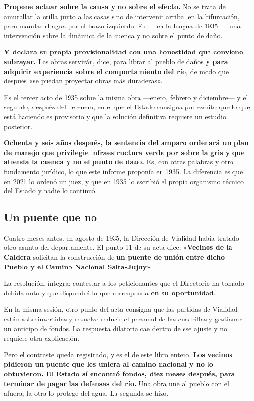 \textbf{Propone actuar sobre la causa y no sobre el efecto.} No se trata de amurallar la
orilla junto a las casas sino de intervenir arriba, en la bifurcación, para mandar el agua
por el brazo izquierdo. Es --- en la lengua de 1935 --- una intervención sobre la dinámica de
la cuenca y no sobre el punto de daño.

\textbf{Y declara su propia provisionalidad con una honestidad que conviene subrayar.} Las
obras servirán, dice, para librar al pueblo de daños \textbf{y para adquirir experiencia
sobre el comportamiento del río}, de modo que después «se puedan proyectar obras más
duraderas».

Es el tercer acto de 1935 sobre la misma obra ---enero, febrero y diciembre--- y el segundo, después del de enero, en el que el Estado consigna por escrito que lo que está haciendo es provisorio y que la
solución definitiva requiere un estudio posterior.

\textbf{Ochenta y seis años después, la sentencia del amparo ordenará un plan de manejo que
privilegie infraestructura verde por sobre la gris y que atienda la cuenca y no el punto de
daño.} Es, con otras palabras y otro fundamento jurídico, lo que este informe proponía en
1935. La diferencia es que en 2021 lo ordenó un juez, y que en 1935 lo escribió el propio
organismo técnico del Estado y nadie lo continuó.

\subsection*{Un puente que no}

Cuatro meses antes, en agosto de 1935, la Dirección de Vialidad había tratado otro asunto del
departamento. El punto 11 de su acta dice: «\textbf{Vecinos de la Caldera} solicitan la
construcción de \textbf{un puente de unión entre dicho Pueblo y el Camino Nacional
Salta-Jujuy}».

La resolución, íntegra: contestar a los peticionantes que el Directorio ha tomado debida nota
y que dispondrá lo que corresponda \textbf{en su oportunidad}.

En la misma sesión, otro punto del acta consigna que las partidas de Vialidad están
sobreinvertidas y resuelve reducir el personal de las cuadrillas y gestionar un anticipo de
fondos. La respuesta dilatoria cae dentro de ese ajuste y no requiere otra explicación.

Pero el contraste queda registrado, y es el de este libro entero. \textbf{Los vecinos pidieron
un puente que los uniera al camino nacional y no lo obtuvieron. El Estado sí encontró
fondos, diez meses después, para terminar de pagar las defensas del río.} Una obra une al
pueblo con el afuera; la otra lo protege del agua. La segunda se hizo.

